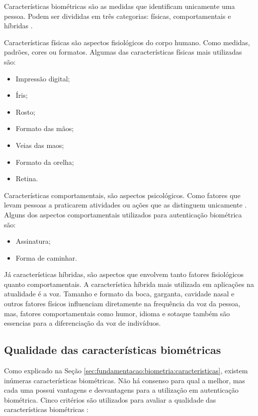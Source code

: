 \par Características biométricas são as medidas que identificam unicamente uma pessoa. Podem ser divididas em três categorias: físicas, comportamentais e híbridas \cite{li2009encyclopedia}.

\par Características físicas são aspectos fisiológicos do corpo humano. Como medidas, padrões, cores ou
formatos. Algumas das características físicas mais utilizadas são:

\begin{itemize}
    \item Impressão digital;
    \item Íris;
    \item Rosto;
    \item Formato das mãos;
    \item Veias das maos;
    \item Formato da orelha;
    \item Retina.
\end{itemize}

\par Características comportamentais, são aspectos psicológicos. Como fatores que levam pessoas a praticarem atividades ou ações que as distinguem unicamente \cite{wayman2005biometric}. Alguns dos aspectos comportamentais utilizados para autenticação biométrica são:

\begin{itemize}
    \item Assinatura;
    \item Forma de caminhar.
\end{itemize}

\par Já características híbridas, são aspectos que envolvem tanto fatores fisiológicos quanto comportamentais. A característica híbrida mais utilizada em aplicações na atualidade é a voz. Tamanho e formato da boca, garganta, cavidade nasal e outros fatores físicos influenciam diretamente na frequência da voz da pessoa, mas, fatores comportamentais como humor, idioma e sotaque também são essencias para a diferenciação da voz de indivíduos.

\subsection{Qualidade das características biométricas} \label{sec:fundamentacao:biometria:criterios}

\par Como explicado na Seção \ref{sec:fundamentacao:biometria:caracteristicas}, existem inúmeras características biométricas. Não há consenso para qual a melhor, mas cada uma possui vantagens e desvantagens para a utilização em autenticação biométrica. Cinco critérios são utilizados para avaliar a qualidade das características biométricas \cite{wayman2001}:

